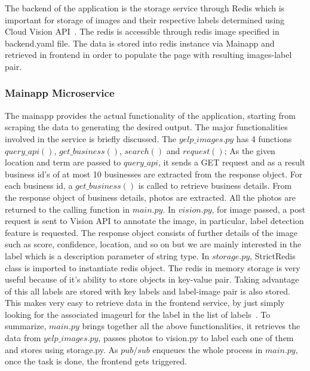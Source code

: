 The backend of the application is the storage service through Redis
which is important for storage of images and their respective labels
determined using Cloud Vision API~\cite{hid-sp18-602-redis}. The redis
is accessible through redis image specified in backend.yaml file. The
data is stored into redis instance via Mainapp and retrieved in
frontend in order to populate the page with resulting images-label
pair.

\subsubsection{Mainapp Microservice} 


The mainapp provides the actual functionality of the application,
starting from scraping the data to generating the desired output. The
major functionalities involved in the service is briefly discussed.
The $yelp\_images.py$ has 4 functions $query\_api()$,
$get\_business()$, $search()$ and $request()$; As the given location
and term are passed to $query\_api$, it sends a GET request and as a
result business id’s of at most 10 businesses are extracted from the
response object. For each business id, a $get\_business()$ is called
to retrieve business details. From the response object of business
details, photos are extracted. All the photos are returned to the
calling function in $main.py$.  In $vision.py$, for image passed, a
post request is sent to Vision API to annotate the image, in
particular, label detection feature is requested. The response object
consists of further details of the image such as score, confidence,
location, and so on but we are mainly interested in the label which is
a description parameter of string type. In $storage.py$, StrictRedis
class is imported to instantiate redis object. The redis in memory
storage is very useful because of it’s ability to store objects in
key-value pair. Taking advantage of this all labels are stored with
key labels and label-image pair is also stored. This makes very easy
to retrieve data in the frontend service, by just simply looking for
the associated imageurl for the label in the list of
labels~\cite{hid-sp18-602-redis-implementation}.  To summarize,
$main.py$ brings together all the above functionalities, it retrieves
the data from $yelp\_images.py$, passes photos to vision.py to label
each one of them and stores using storage.py. As $pub/sub$ enqueues
the whole process in $main.py$, once the task is done, the frontend
gets triggered.
  
